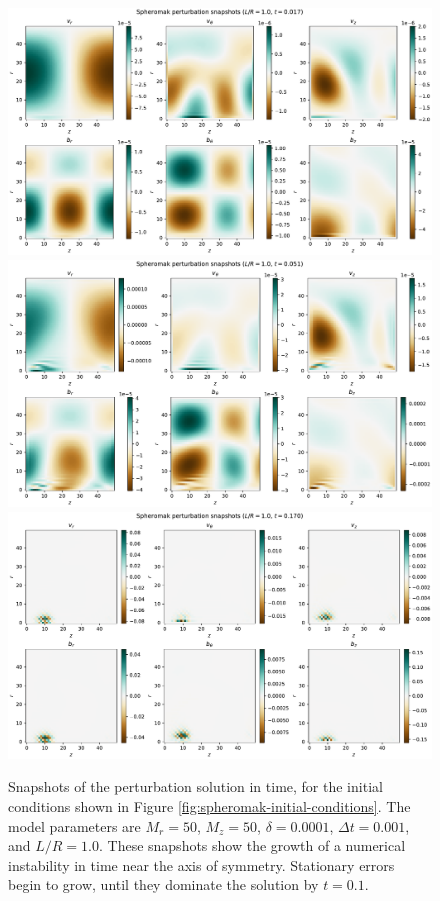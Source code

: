 \documentclass[%
 reprint,
 amsmath,amssymb,
 aps,
]{revtex4-2}
\begin{document}
\begin{figure}[H]
\includegraphics[width=0.9\linewidth]{proj2-3/spheromak_snapshot_1.pdf}
\includegraphics[width=0.9\linewidth]{proj2-3/spheromak_snapshot_3.pdf}
\includegraphics[width=0.9\linewidth]{proj2-3/spheromak_snapshot_10.pdf}
\caption{\label{fig:spheromak-instability-snapshots}Snapshots of the perturbation solution in time, for the initial conditions shown in Figure \ref{fig:spheromak-initial-conditions}. The model parameters are $M_r=50$, $M_z=50$, $\delta =0.0001$, $\Delta t=0.001$, and $L/R=1.0$. These snapshots show the growth of a numerical instability in time near the axis of symmetry. Stationary errors begin to grow, until they dominate the solution by $t=0.1$.}
\end{figure}
\end{document}
